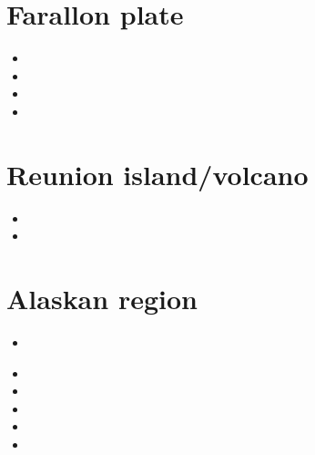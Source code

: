 \section{Farallon plate} 

\begin{scriptsize}
\begin{itemize}
\item[\twothousandeight]
\item[\twothousandeleven]
\item[\twothousandtwelve]
\item[\twothousandsixteen]
\end{itemize}
\end{scriptsize}

\section{Reunion island/volcano}

\begin{scriptsize}
\begin{itemize}
\item[\twothousandseventeen]
\item[\twothousandtwentytwo]
\end{itemize}
\end{scriptsize}

\section{Alaskan region} 

\begin{scriptsize}
\begin{itemize}
\item[\twothousandten] 
  \\
\item[\twothousandtwelve] 
\item[\twothousandthirteen] 
\item[\twothousandfifteen] 
\item[\twothousandseventeen] 
\item[\twothousandeighteen] 
\end{itemize}
\end{scriptsize}

